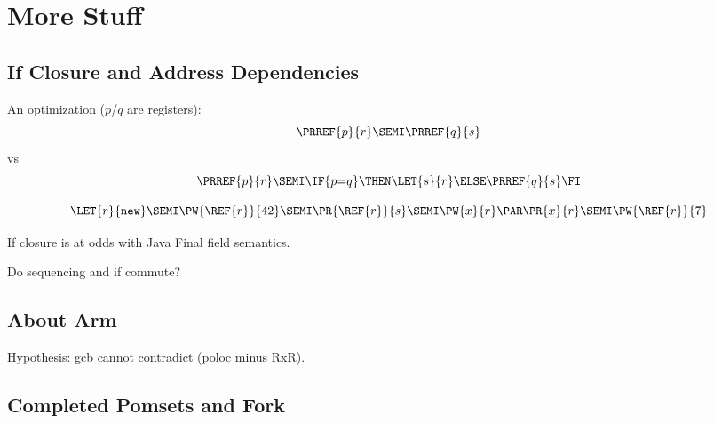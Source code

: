 \section{More Stuff}

\subsection{If Closure and Address Dependencies}
\label{sec:addr}

An optimization ($p$/$q$ are registers):
\begin{displaymath}
  \PRREF{p}{r}\SEMI
  \PRREF{q}{s}
\end{displaymath}
vs
\begin{displaymath}
  \PRREF{p}{r}\SEMI
  \IF{p{=}q}\THEN \LET{s}{r} \ELSE \PRREF{q}{s}\FI
\end{displaymath}

\begin{displaymath}
  \LET{r}{\mathtt{new}}\SEMI
  \PW{\REF{r}}{42}\SEMI
  \PR{\REF{r}}{s}\SEMI
  \PW{x}{r}
  \PAR
  \PR{x}{r}\SEMI
  \PW{\REF{r}}{7}
\end{displaymath}

If closure is at odds with Java Final field semantics.

Do sequencing and if commute?

\subsection{About Arm}
Hypothesis: gcb cannot contradict (poloc minus RxR).


\subsection{Completed Pomsets and Fork}
\label{sec:fork}

